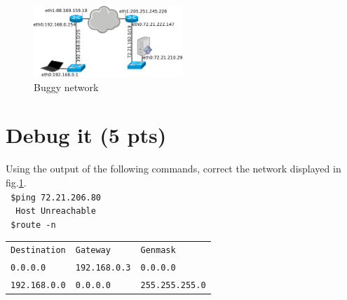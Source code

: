 \documentclass[11pt]{article}
\begin{document}
\begin{figure}
   \vspace{-40pt}
   \begin{center}
    \includegraphics[width=0.5\textwidth]{./ntwk.pdf}
   \end{center}
   \vspace{-10pt}
  \caption{Buggy network}
     \vspace{-90pt}
  \label{bgg-ntwk}
\end{figure}


\section{Debug it (5 pts)}\vspace{-11pt}
Using the output of the following commands, correct the network displayed in fig.\ref{bgg-ntwk}. \\
\verb+ $ping 72.21.206.80+ \\
\verb+  Host Unreachable+ \\
\verb+ $route -n + \\
\begin{tabular}{lll}
	\verb+Destination+ & \verb+Gateway+ & \verb+Genmask+ \\
	\verb+0.0.0.0+ 			 & \verb+192.168.0.3+		& \verb+0.0.0.0+ \\
	\verb+192.168.0.0+			 & \verb+0.0.0.0+			& \verb+255.255.255.0+ \\
\end{tabular}


\pagebreak
\setlength{\columnseprule}{1pt}
\end{document}

